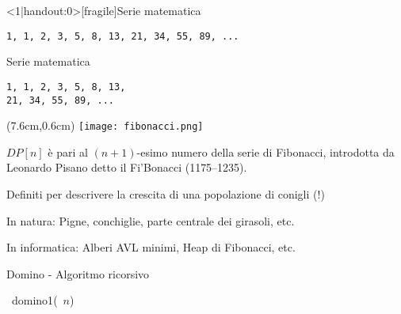 \begin{frame}<1|handout:0>[fragile]{Serie matematica}

\vspace{-9pt}

\begin{lstlisting}
1, 1, 2, 3, 5, 8, 13, 21, 34, 55, 89, ...
\end{lstlisting}


\end{frame}


\begin{frame}[fragile]{Serie matematica}

\vspace{-9pt}

\begin{lstlisting}
1, 1, 2, 3, 5, 8, 13, 
21, 34, 55, 89, ...
\end{lstlisting}

\begin{textblock*}{5cm}(7.6cm,0.6cm) %
\texttt{[image: fibonacci.png]}
\end{textblock*}

\begin{myboxtitle}
$\mathit{DP}[n]$ è pari al $(n+1)$-esimo numero della serie di Fibonacci, introdotta da Leonardo Pisano detto il Fi'Bonacci (1175--1235).
\end{myboxtitle}

\BIL
\item Definiti per descrivere la crescita di una popolazione di conigli (!)
\item In natura: Pigne, conchiglie, parte centrale dei girasoli, etc.
\item In informatica: Alberi AVL minimi, Heap di Fibonacci, etc.
\EIL

\end{frame}


\begin{frame}[fragile]{Domino - Algoritmo ricorsivo}

\vspace{-9pt}

\begin{Procedure}
\caption[A]{\INTEGER\ \textsf{domino1}(\INTEGER\ $n$)}
\end{Procedure}


\end{frame}

